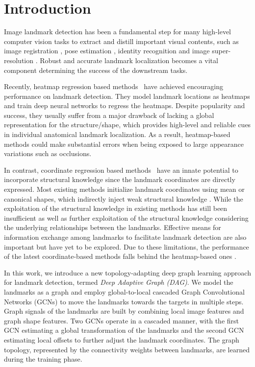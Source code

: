 \documentclass[runningheads]{llncs}
\begin{document}
\section{Introduction}
Image landmark detection has been a fundamental step for many high-level computer vision tasks to extract and distill important visual contents, such as image registration \cite{han2015robust}, pose estimation \cite{bulat2017binarized}, identity recognition \cite{zhu2013deep} and image super-resolution \cite{bulat2018super}. Robust and accurate landmark localization becomes a vital component determining the success of the downstream tasks.

Recently, heatmap regression based methods~\cite{wu2018look,zhu2019robust,sun2019deep,valle2018deeply} have achieved encouraging performance on landmark detection. They model landmark locations as heatmaps and train deep neural networks to regress the heatmaps. Despite popularity and success, they usually suffer from a major drawback of lacking a global representation for the structure/shape, which provides high-level and reliable cues in individual anatomical landmark localization. As a result, heatmap-based methods could make substantial errors when being exposed to large appearance variations such as occlusions.

In contrast, coordinate regression based methods~\cite{lv2017deep,zhang2015learning,yu2016deep,trigeorgis2016mnemonic} have an innate potential to incorporate structural knowledge since the landmark coordinates are directly expressed. Most existing methods initialize landmark coordinates using mean or canonical shapes, which indirectly inject weak structural knowledge \cite{trigeorgis2016mnemonic}. While the exploitation of the structural knowledge in existing methods has still been insufficient as well as further exploitation of the structural knowledge considering the underlying relationships between the landmarks. Effective means for information exchange among landmarks to facilitate landmark detection are also important but have yet to be explored. Due to these limitations, the performance of the latest coordinate-based methods \cite{wu2017leveraging} falls behind the heatmap-based ones \cite{wang2019adaptive}.

In this work, we introduce a new topology-adapting deep graph learning approach for landmark detection, termed \textit{Deep Adaptive Graph (DAG)}. We model the landmarks as a graph and employ global-to-local cascaded Graph Convolutional Networks (GCNs) to move the landmarks towards the targets in multiple steps. Graph signals of the landmarks are built by combining local image features and graph shape features. Two GCNs operate in a cascaded manner, with the first GCN estimating a global transformation of the landmarks and the second GCN estimating local offsets to further adjust the landmark coordinates. The graph topology, represented by the connectivity weights between landmarks, are learned during the training phase. 
\end{document}
